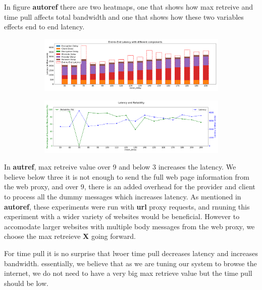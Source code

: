 \documentclass[a4paper,11pt,oneside]{report}
\begin{document}
In figure \textbf{autoref} there are two heatmaps, one that shows how max retreive and time pull affects total bandwidth and one that shows how these two variables effects end to end latency.
\begin{figure}[htbp]
    \centering
    \begin{subfigure}{\textwidth}
        \centering
        \includegraphics[width=\textwidth]{plots/delays_latency_components.png}
        \caption{}
        \label{fig:lambdas_latency}
    \end{subfigure}
    \hfill
    \centering
    \begin{subfigure}{\textwidth}
        \centering
        \includegraphics[width=\textwidth]{plots/delays_reliability_latency.png}
        \caption{}
        \label{fig:heatmap_bandwidth.png}
    \end{subfigure}
\end{figure}


In \textbf{autref}, max retreive value over 9 and below 3 increases the latency. We believe below three it is not enough to send the full web page information from the web proxy, and over 9, there is an added overhead for the provider and client to process all the dummy messages which increases latency. As mentioned in \textbf{autoref}, these experiments were run with \textbf{url} proxy requests, and rnuning this experiment with a wider variety of websites would be beneficial. However to accomodate larger websites with multiple body messages from the web proxy, we choose the max retreieve \textbf{X} going forward.

For time pull it is no surprise that lwoer time pull decreases latency and increases bandwidth.
essentially, we believe that as we are tuning our system to browse the internet, we do not need to have a very big max retrieve value but the time pull should be low.
\end{document}
